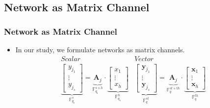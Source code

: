 \documentclass[c]{beamer}
\begin{document}
\subsection{Network as Matrix Channel}
\begin{frame}[c]
\frametitle{Network as Matrix Channel}
	\begin{itemize}
		\item In our study, we formulate networks as matrix channels.
			\begin{equation}
			\begin{array}{c|c}
			Scalar & Vector\\
			\underset{\ensuremath{\mathbb{F}}_{q_{\mathrm{s}}}^{s}}{\underbrace{\left[\begin{array}{c}
			y_{j_{1}}\\
			\vdots\\
			y_{j_{s}}
			\end{array}\right]}}=\underset{\ensuremath{\mathbb{F}}_{q_{\mathrm{s}}}^{s\times h}}{\underbrace{\boldsymbol{A}_{j}}}\cdot\underset{\ensuremath{\mathbb{F}}_{q_{s}}^{h}}{\underbrace{\left[\begin{array}{c}
			x_{1}\\
			\vdots\\
			x_{h}
			\end{array}\right]}} & \underset{\ensuremath{\mathbb{F}}_{q}^{st}}{\underbrace{\left[\begin{array}{c}
			\boldsymbol{y}_{j_{1}}\\
			\vdots\\
			\boldsymbol{y}_{j_{s}}
			\end{array}\right]}}=\underset{\ensuremath{\mathbb{F}}_{q}^{st\times th}}{\underbrace{\boldsymbol{A}_{j}}}\cdot\underset{\ensuremath{\mathbb{F}}_{q}^{th}}{\underbrace{\left[\begin{array}{c}
			\boldsymbol{x}_{1}\\
			\vdots\\
			\boldsymbol{x}_{h}
			\end{array}\right]}}
			\end{array}\label{eq:linear_system}
			\end{equation}


\end{itemize}
\end{frame}
\end{document}
